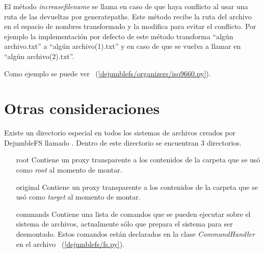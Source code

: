 El método \textit{increasefilename} se llama en caso de que haya conflicto al usar una ruta de las devueltas por generatepaths. Este método recibe la ruta del archivo en el espacio de nombres transformado y la modifica para evitar el conflicto. Por ejemplo la implementación por defecto de este método transforma ``algún archivo.txt'' a ``algún archivo(1).txt'' y en caso de que se vuelva a llamar en ``algún archivo(2).txt''.

Como ejemplo se puede ver ~(\ref{dejumblefs/organizers/iso9660.py}).


\section{Otras consideraciones}

Existe un directorio especial en todos los sistemas de archivos creados por DejumbleFS llamado . Dentro de este directorio se encuentran 3 directorios.

\begin{itemize}
\item[root] Contiene un proxy transparente a los contenidos de la carpeta que se usó como \textit{root} al momento de montar.
\item[original] Contiene un proxy transparente a los contenidos de la carpeta que se usó como \textit{target} al momento de montar.
\item[commands] Contiene una lista de comandos que se pueden ejecutar sobre el sistema de archivos, actualmente sólo  que prepara el sistema para ser desmontado. Estos comandos están declarados en la clase \textit{CommandHandler} en el archivo ~(\ref{dejumblefs/fs.py}).
\end{itemize}



